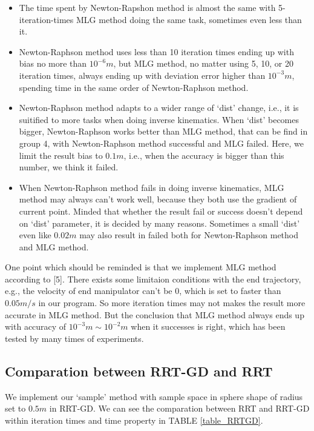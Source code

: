 \documentclass[letterpaper, 10 pt, conference]{ieeeconf}  %
\begin{document}
\begin{itemize}

\item  The time spent by Newton-Rapshon method is almost the same with 5-iteration-times MLG method doing the same task, sometimes even less than it.
\item  Newton-Raphson method uses less than 10 iteration times ending up with bias no more than $10^{-6}m$, but MLG method, no matter using 5, 10, or 20 iteration times, always ending up with deviation error higher than $10^{-3}m$, spending time in the same order of Newton-Raphson method.
\item Newton-Raphson method adapts to a wider range of `dist' change, i.e., it is suitified to more tasks when doing inverse kinematics. When `dist' becomes bigger, Newton-Raphson works better than MLG method, that can be find in group 4, with Newton-Raphson method successful and MLG failed. Here, we limit the result bias to $0.1m$, i.e., when the accuracy is bigger than this number, we think it failed.
\item When Newton-Raphson method fails in doing inverse kinematics, MLG method may always can't work well, because they both use the gradient of current point. Minded that whether the result fail or success doesn't depend on `dist' parameter, it is decided by many reasons. Sometimes a small `dist' even like $0.02m$ may also result in failed both for Newton-Raphson method and MLG method.

\end{itemize}

One point which should be reminded is that we implement MLG method according to [5]. There exists some limitaion conditions with the end trajectory, e.g., the velocity of end manipulator can't be 0, which is set to faster than $0.05m/s$ in our program. So more iteration times may not makes the result more accurate in MLG method. But the conclusion that MLG method always ends up with accuracy of $10^{-3}m\sim10^{-2}m$ when it successes is right, which has been tested by many times of experiments.

\subsection{Comparation between RRT-GD and RRT}

We implement our `sample' method with sample space in sphere shape of radius set to $0.5m$ in RRT-GD. We can see the comparation between RRT and RRT-GD within iteration times and time property in TABLE \ref{table_RRTGD}.
\end{document}
